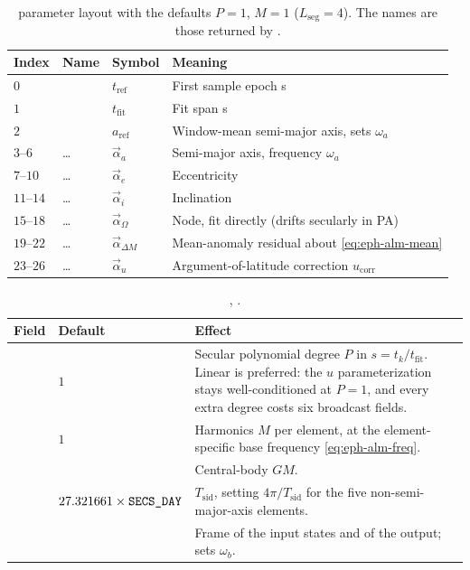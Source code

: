 \begin{table}[H]
  \centering
  \caption{ parameter layout with the defaults $P = 1$,
    $M = 1$ ($L_\mathrm{seg} = 4$). The names are those returned by
    .}
  \label{tab:eph-alm-params}
  \begin{tabularx}{\textwidth}{@{}l l l L@{}}
    \toprule
    Index & Name & Symbol & Meaning \\
    \midrule
    $0$ &  & $t_\mathrm{ref}$ & First sample epoch \si{\second} \\
    $1$ &  & $t_\mathrm{fit}$ & Fit span \si{\second} \\
    $2$ &  & $a_\mathrm{ref}$ & Window-mean semi-major axis, sets $\omega_a$ \\
    \midrule
    $3$--$6$   & \dots{}    & $\vec{\alpha}_a$ & Semi-major axis, frequency $\omega_a$ \\
    $7$--$10$  & \dots{}    & $\vec{\alpha}_e$ & Eccentricity \\
    $11$--$14$ & \dots{}    & $\vec{\alpha}_i$ & Inclination \\
    $15$--$18$ & \dots{} & $\vec{\alpha}_\Omega$ & Node, fit directly (drifts secularly in PA) \\
    $19$--$22$ & \dots{}    & $\vec{\alpha}_{\Delta M}$ & Mean-anomaly residual about \cref{eq:eph-alm-mean} \\
    $23$--$26$ & \dots{}    & $\vec{\alpha}_u$ & Argument-of-latitude correction $u_\mathrm{corr}$ \\
    \bottomrule
  \end{tabularx}
\end{table}

\begin{table}[H]
  \centering
  \caption{, .}
  \label{tab:eph-alm-opts}
  \begin{tabularx}{\textwidth}{@{}l l L@{}}
    \toprule
    Field & Default & Effect \\
    \midrule
     & $1$ &
      Secular polynomial degree $P$ in $s = t_k/t_\mathrm{fit}$. Linear is
      preferred: the $u$ parameterization stays well-conditioned at $P = 1$,
      and every extra degree costs six broadcast fields. \\
     & $1$ &
      Harmonics $M$ per element, at the element-specific base frequency
      \cref{eq:eph-alm-freq}. \\
     &  & Central-body $GM$. \\
     & $27.321661\times\texttt{SECS\_DAY}$ &
      $T_\mathrm{sid}$, setting $4\pi/T_\mathrm{sid}$ for the five
      non-semi-major-axis elements. \\
     &  &
      Frame of the input states and of the output; sets $\omega_b$. \\
    \bottomrule
  \end{tabularx}
\end{table}

